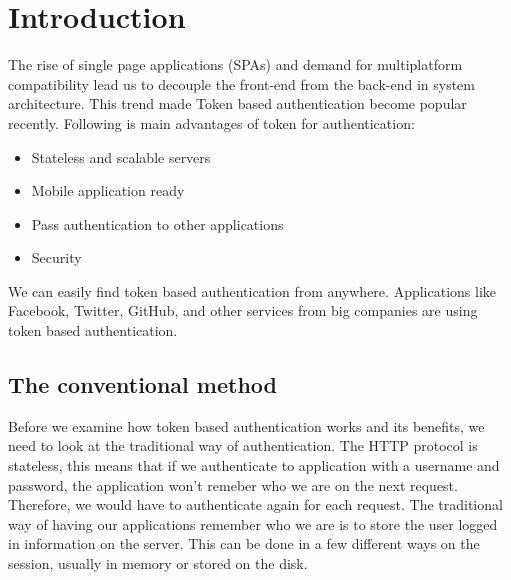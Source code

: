 \documentclass[journal,article,submit,moreauthors,pdftex,10pt,a4paper]{mdpi}
\begin{document}


\section{Introduction}

The rise of single page applications (SPAs) and demand for multiplatform compatibility lead us to decouple the front-end from the back-end in system architecture. This trend made Token based authentication become popular recently\cite{authentication}. Following is main advantages of token for authentication:
\begin{itemize}[leftmargin=*,labelsep=4mm]
\item	Stateless and scalable servers
\item	Mobile application ready
\item	Pass authentication to other applications
\item	Security
\end{itemize}

We can easily find token based authentication from anywhere. Applications like Facebook, Twitter, GitHub, and other services from big companies are using token based authentication.

\subsection{The conventional method}
Before we examine how token based authentication works and its benefits, we need to look at the traditional way of authentication.
The HTTP protocol is stateless, this means that if we authenticate to application with a username and password, the application won’t remeber who we are on the next request. Therefore, we would have to authenticate again for each request. The traditional way of having our applications remember who we are is to store the user logged in information on the server. This can be done in a few different ways on the session, usually in memory or stored on the disk\cite{authorization}.
\end{document}
